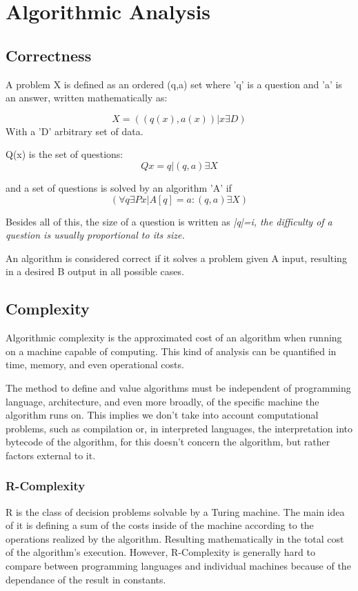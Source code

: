 \documentclass[12pt,a4paper,olive]{bbe}
\begin{document}
			
	\chapter{Algorithmic Analysis}
	\section{Correctness}
	A problem X is defined as an ordered (q,a) set where 'q' is a question and 'a' is an answer, written mathematically as: 
 
	
	$$X={((q(x),a(x)) | x \exists D)}$$
	With a 'D' arbitrary set of data.
	
	Q(x) is the set of questions:
	$$ Qx = {q | (q, a) \exists X} $$

	and a set of questions is solved by an algorithm 'A' if
	$$ (\forall q \exists Px | A[q] = a :(q, a) \exists X) $$

	Besides all of this, the size of a question is written as 
	\it|q|=i\it, the difficulty of
	a question is usually proportional to its size.

	An algorithm is considered correct if it solves a problem given A input, resulting in a desired B output in all possible cases.
	
	\section{Complexity}
	Algorithmic complexity is the approximated cost of an algorithm when running on a machine capable of computing. This kind of analysis can be quantified in time, memory, and even operational costs.

	\begin{remark}
	The method to define and value algorithms must be independent of programming language, architecture, and even more broadly, of the specific machine the algorithm runs on. This implies we don't take into account computational problems, such as compilation or, in interpreted languages, the interpretation into bytecode of the algorithm, for this doesn't concern the algorithm, but rather factors external to it.   
	\end{remark}

	\subsection{R-Complexity}
	R is the class of decision problems solvable by a Turing machine. The main idea of it is defining a sum of the costs inside of the machine according to the operations realized by the algorithm. Resulting mathematically in the total cost of the algorithm's execution. However, R-Complexity is generally hard to compare between programming languages and individual machines because of the dependance of the result in constants.
\end{document}

